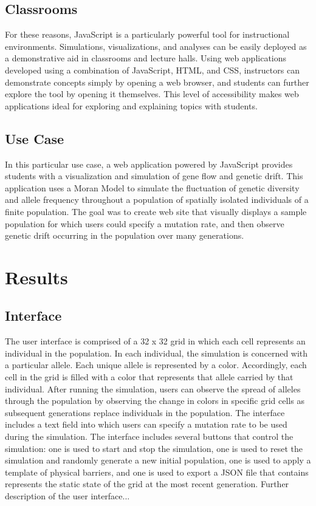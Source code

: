 \documentclass[12pt]{article}
\begin{document}
\begin{spacing}{1.5}
\subsection{Classrooms}
For these reasons, JavaScript is a particularly powerful tool for  instructional environments. Simulations, visualizations, and analyses can be easily deployed as a demonstrative aid in classrooms and lecture halls. Using web applications developed using a combination of JavaScript, HTML, and CSS, instructors can demonstrate concepts simply by opening a web browser, and students can further explore the tool by opening it themselves. This level of accessibility makes web applications ideal for exploring and explaining topics with students.
\subsection{Use Case}
In this particular use case, a web application powered by JavaScript provides students with a visualization and simulation of gene flow and genetic drift. This application uses a Moran Model to simulate the fluctuation of genetic diversity and allele frequency throughout a population of spatially isolated individuals of a finite population. The goal was to create web site that visually displays a sample population for which users could specify a mutation rate, and then observe genetic drift occurring in the population over many generations.

\section{Results}
\subsection{Interface}
The user interface is comprised of a 32 x 32 grid in which each cell represents an individual in the population. In each individual, the simulation is concerned with a particular allele. Each unique allele is represented by a color. Accordingly, each cell in the grid is filled with a color that represents that allele carried by that individual. After running the simulation, users can observe the spread of alleles through the population by observing the change in colors in specific grid cells as subsequent generations replace individuals in the population. The interface includes a text field into which users can specify a mutation rate to be used during the simulation. The interface includes several buttons that control the simulation: one is used to start and stop the simulation, one is used to reset the simulation and randomly generate a new initial population, one is used to apply a template of physical barriers, and one is used to export a JSON file that contains represents the static state of the grid at the most recent generation. Further description of the user interface...

\end{spacing}
\end{document}
